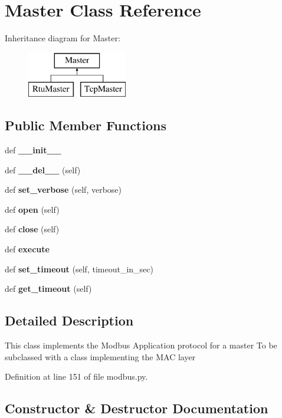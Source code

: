 \section{Master Class Reference}
\label{classmodbus__tk_1_1modbus_1_1_master}
Inheritance diagram for Master\+:\begin{figure}[H]
\begin{center}
\leavevmode
\includegraphics[height=2.000000cm]{classmodbus__tk_1_1modbus_1_1_master}
\end{center}
\end{figure}
\subsection*{Public Member Functions}
\begin{DoxyCompactItemize}
\item 
def {\bf \+\_\+\+\_\+init\+\_\+\+\_\+}
\item 
def {\bf \+\_\+\+\_\+del\+\_\+\+\_\+} (self)
\item 
def {\bf set\+\_\+verbose} (self, verbose)
\item 
def {\bf open} (self)
\item 
def {\bf close} (self)
\item 
def {\bf execute}
\item 
def {\bf set\+\_\+timeout} (self, timeout\+\_\+in\+\_\+sec)
\item 
def {\bf get\+\_\+timeout} (self)
\end{DoxyCompactItemize}


\subsection{Detailed Description}
\begin{DoxyVerb}This class implements the Modbus Application protocol for a master
To be subclassed with a class implementing the MAC layer
\end{DoxyVerb}
 

Definition at line 151 of file modbus.\+py.



\subsection{Constructor \& Destructor Documentation}
